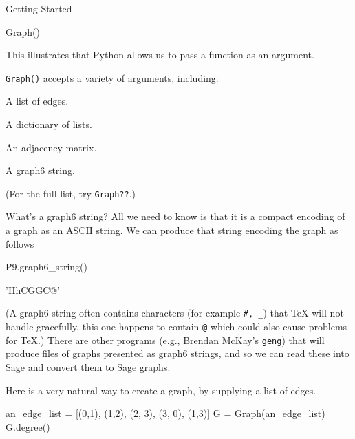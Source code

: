 \begin{chap}{Getting Started}
\begin{sect}{Graph()}
%
\begin{para}
This illustrates that Python allows us to pass a function as an argument.
\end{para}
%
\begin{para}
\verb|Graph()| accepts a variety of arguments, including:
\begin{enumerate}
    \begin{listitem}A list of edges.\end{listitem}
    \begin{listitem}A dictionary of lists.\end{listitem}
    \begin{listitem}An adjacency matrix.\end{listitem}
    \begin{listitem}A graph6 string.\end{listitem}
\end{enumerate}
(For the full list, try \verb|Graph??|.)
\end{para}
%
\begin{para}
What's a graph6 string? All we need to know is that it is a compact
encoding of a graph as an ASCII string.  We can produce that string encoding
the graph as follows
\end{para}
%
\begin{sagecode}
\begin{sageinput}
P9.graph6_string()
\end{sageinput}
\begin{sageoutput}
'HhCGGC@'
\end{sageoutput}
\end{sagecode}
%
\begin{para}
(A graph6 string often contains characters (for example \verb|#, _|) that \TeX{} 
will not handle gracefully, this one happens to contain \verb|@| which could also cause problems for \TeX{}.)
There are other programs (e.g., Brendan McKay's \verb|geng|) that will produce files of
graphs presented as graph6 strings, and so we can read these into
Sage and convert them to Sage graphs. 
\end{para}
%
\begin{para}
Here is a very natural way to create a graph, by supplying a list of edges.
\end{para}
%
\begin{sagecode}
\begin{sageinput}
an_edge_list = [(0,1), (1,2), (2, 3), (3, 0), (1,3)]
G = Graph(an_edge_list)
G.degree()
\end{sageinput}

\end{sagecode}
\end{sect}
\end{chap}
